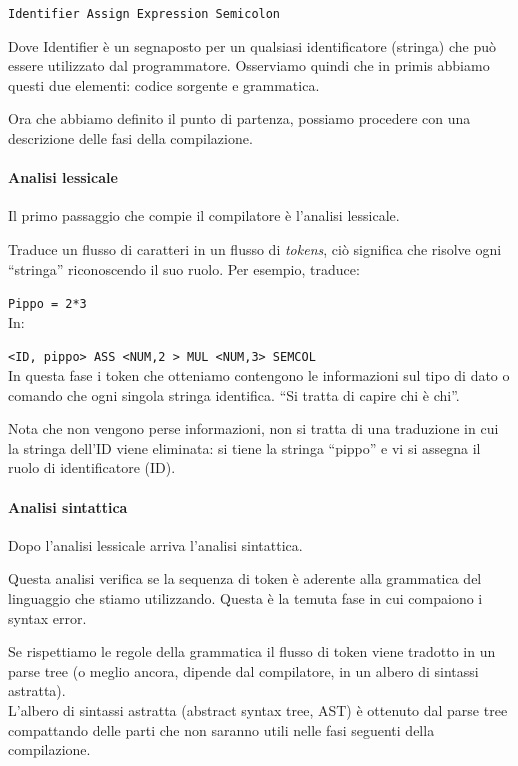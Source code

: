 \documentclass[class=book, crop=false, oneside]{standalone}
\begin{document}
\texttt{Identifier Assign Expression Semicolon}

Dove Identifier è un segnaposto per un qualsiasi identificatore (stringa) che può essere utilizzato dal programmatore.
Osserviamo quindi che in primis abbiamo questi due elementi: codice sorgente e grammatica.

Ora che abbiamo definito il punto di partenza, possiamo procedere con una descrizione delle fasi della compilazione.

\paragraph{Analisi lessicale}
Il primo passaggio che compie il compilatore è l’analisi lessicale.

Traduce un flusso di caratteri in un flusso di \emph{tokens}, ciò significa che risolve ogni “stringa” riconoscendo il suo ruolo. Per esempio, traduce:

\texttt{Pippo = 2*3}\\
In:

\texttt{<ID, pippo> ASS <NUM,2 > MUL <NUM,3> SEMCOL}\\
In questa fase i token che otteniamo contengono le informazioni sul tipo di dato o comando che ogni singola stringa identifica. “Si tratta di capire chi è chi”.

Nota che non vengono perse informazioni, non si tratta di una traduzione in cui la stringa dell’ID viene eliminata: si tiene la stringa “pippo” e vi si assegna il ruolo di identificatore (ID).

\paragraph{Analisi sintattica}
Dopo l’analisi lessicale arriva l’analisi sintattica.

Questa analisi verifica se la sequenza di token è aderente alla grammatica del linguaggio che stiamo utilizzando. Questa è la temuta fase in cui compaiono i syntax error.

Se rispettiamo le regole della grammatica il flusso di token viene tradotto in un parse tree (o meglio ancora, dipende dal compilatore, in un albero di sintassi astratta).\\
L’albero di sintassi astratta (abstract syntax tree, AST) è ottenuto dal parse tree compattando delle parti che non saranno utili nelle fasi seguenti della compilazione.
\end{document}
